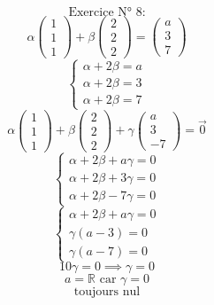 \documentclass{article}
\begin{document}
\[ \text{Exercice N° 8:} \]
\[ \alpha \begin{pmatrix} 1 \\ 1 \\ 1 \end{pmatrix} + \beta \begin{pmatrix} 2 \\ 2 \\ 2 \end{pmatrix} = \begin{pmatrix} a \\ 3 \\ 7 \end{pmatrix} \]
\[ \begin{cases} \alpha + 2\beta = a \\ \alpha + 2\beta = 3 \\ \alpha + 2\beta = 7 \end{cases} \]
\[ \alpha \begin{pmatrix} 1 \\ 1 \\ 1 \end{pmatrix} + \beta \begin{pmatrix} 2 \\ 2 \\ 2 \end{pmatrix} + \gamma \begin{pmatrix} a \\ 3 \\ -7 \end{pmatrix} = \vec{0} \]
\[ \begin{cases} \alpha + 2\beta + a\gamma = 0 \\ \alpha + 2\beta + 3\gamma = 0 \\ \alpha + 2\beta - 7\gamma = 0 \end{cases} \]
\[ \begin{cases} \alpha + 2\beta + a\gamma = 0 \\ \gamma(a-3) = 0 \\ \gamma(a-7) = 0 \end{cases} \]
\[ 10\gamma = 0 \implies \gamma = 0 \]
\[ a = \mathbb{R} \text{ car } \gamma = 0 \]
\[ \text{toujours nul} \]
\end{document}
